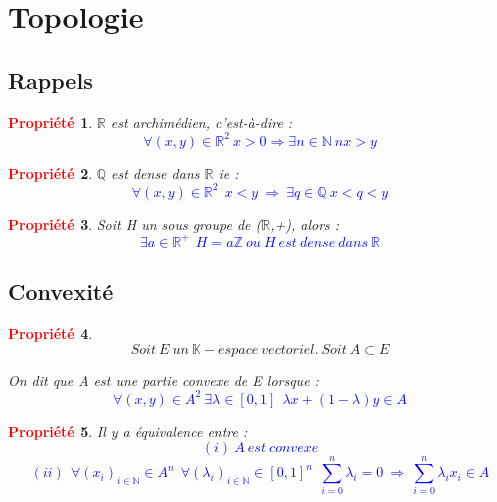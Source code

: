 \documentclass{article}
\begin{document}
\section{Topologie }

\subsection{Rappels }



\theoremstyle{plain}
\newtheorem{theo} {\textcolor{red}{ Propriété }}[subsection]
\begin{theo}
$\mathbb{R}$ est archimédien, c'est-à-dire :\textcolor{blue}{ \[\forall (x,y) \in \mathbb{R}^{2} \ x> 0 \Rightarrow \exists n \in \mathbb{N} \   nx > y \]}

\end{theo}

\begin{theo}
$\mathbb{Q}$ est dense dans $\mathbb{R}$ ie :\textcolor{blue}{ \[ \forall (x,y) \in \mathbb{R}^{2} \ \  x<y \  \Rightarrow \    \exists q \in \mathbb{Q} \ x<q<y \]}

\end{theo}

\begin{theo}
Soit H un sous groupe de ($\mathbb{R}$,+), alors :\textcolor{blue}{
\[ \exists a \in \mathbb{R^{+}} \ \ H= a\mathbb{Z} \   ou \ H \ est \ dense \ dans \ \mathbb{R}\]}

\end{theo}
\subsection{Convexité }

\begin{theo}
\[ Soit \ E \ un\  \mathbb{K}-espace \  vectoriel.\  Soit\  A \subset E\]
 
On dit que A est une partie convexe de E lorsque :\textcolor{blue}{
\[ \forall (x,y) \in A^{2} \ \exists \lambda \in [0,1] \ \ \lambda x + (1- \lambda) y \in A \]}
\end{theo}


\begin{theo}
Il y a équivalence entre : \textcolor{blue}{
\[(i) \   A \ est \ convexe \]
\[(ii) \ \ \forall (x_{i})_{i \in \mathbb{N}} \in A^{n} \ \ 
\forall (\lambda_{i})_{i \in \mathbb{N}} \in [0,1]^{n}
\ \ \sum_{i=0}^{n}\lambda_{i} = 0 \ \Rightarrow \ \sum_{i=0}^{n} \lambda_{i}x_{i} \in A
    \]}
\end{theo}
\end{document}
